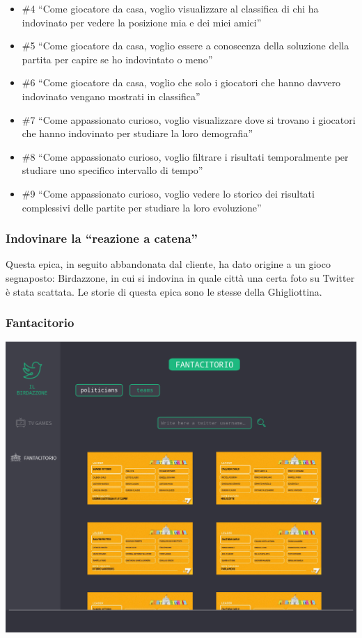 \documentclass{article}
\begin{document}
\begin{itemize}
	\item \#4 ``Come giocatore da casa, voglio visualizzare al classifica di chi ha
	      indovinato per vedere la posizione mia e dei miei amici''
	\item \#5 ``Come giocatore da casa, voglio essere a conoscenza della soluzione
	      della partita per capire se ho indovintato o meno''
	\item \#6 ``Come giocatore da casa, voglio che solo i giocatori che hanno davvero
	      indovinato vengano mostrati in classifica''
	\item \#7 ``Come appassionato curioso, voglio visualizzare dove si trovano i
	      giocatori che hanno indovinato per studiare la loro demografia''
	\item \#8 ``Come appassionato curioso, voglio filtrare i risultati temporalmente
	      per studiare uno specifico intervallo di tempo''
	\item \#9 ``Come appassionato curioso, voglio vedere lo storico dei risultati
	      complessivi delle partite per studiare la loro evoluzione''
\end{itemize}

\subsubsection{Indovinare la ``reazione a catena''}

Questa epica, in seguito abbandonata dal cliente, ha dato origine a un gioco
segnaposto: Birdazzone, in cui si indovina in quale città una certa foto su
Twitter è stata scattata. Le storie di questa epica sono le stesse della
Ghigliottina.

\subsubsection{Fantacitorio}

\includegraphics[width=\textwidth]{mock-fantacitorio-teams}
\end{document}
